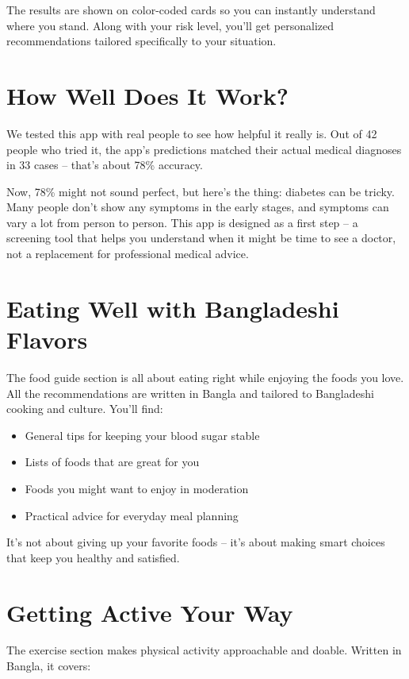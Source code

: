 \documentclass[12pt,a4paper]{article}
\begin{document}
The results are shown on color-coded cards so you can instantly understand where you stand. Along with your risk level, you'll get personalized recommendations tailored specifically to your situation.

\section{How Well Does It Work?}

We tested this app with real people to see how helpful it really is. Out of 42 people who tried it, the app's predictions matched their actual medical diagnoses in 33 cases -- that's about 78\% accuracy.

Now, 78\% might not sound perfect, but here's the thing: diabetes can be tricky. Many people don't show any symptoms in the early stages, and symptoms can vary a lot from person to person. This app is designed as a first step -- a screening tool that helps you understand when it might be time to see a doctor, not a replacement for professional medical advice.

\section{Eating Well with Bangladeshi Flavors}

The food guide section is all about eating right while enjoying the foods you love. All the recommendations are written in Bangla and tailored to Bangladeshi cooking and culture. You'll find:

\begin{itemize}
    \item General tips for keeping your blood sugar stable
    \item Lists of foods that are great for you
    \item Foods you might want to enjoy in moderation
    \item Practical advice for everyday meal planning
\end{itemize}

It's not about giving up your favorite foods -- it's about making smart choices that keep you healthy and satisfied.

\section{Getting Active Your Way}

The exercise section makes physical activity approachable and doable. Written in Bangla, it covers:
\end{document}

